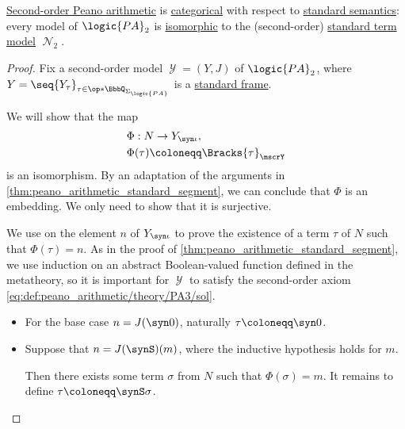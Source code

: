 \begin{proposition}\label{thm:peano_arithmetic_categoricity}
  \hyperref[def:peano_arithmetic]{Second-order Peano arithmetic} is \hyperref[def:hol_theory/categorical]{categorical} with respect to \hyperref[def:hol_semantics/standard]{standard semantics}: every model of \( \logic{PA}_2 \) is \hyperref[def:hol_isomorphism]{isomorphic} to the (second-order) \hyperref[def:peano_arithmetic_term_model]{standard term model} \( \mscrN_2 \).
\end{proposition}
\begin{proof}
  Fix a second-order model \( \mscrY = (Y, J) \) of \( \logic{PA}_2 \), where \( Y = \seq{ Y_\tau }_{\tau \in \op*{\BbbQ_{\Sigma_{\logic{PA}}}}} \) is a \hyperref[def:hol_frame]{standard frame}.

  We will show that the map
  \begin{equation*}
    \begin{aligned}
      &\Phi: N \to Y_{\syn\iota}, \\
      &\Phi(\tau) \coloneqq \Bracks{\tau}_\mscrY
    \end{aligned}
  \end{equation*}
  is an isomorphism. By an adaptation of the arguments in \cref{thm:peano_arithmetic_standard_segment}, we can conclude that \( \Phi \) is an embedding. We only need to show that it is surjective.

  We use  on the element \( n \) of \( Y_{\syn\iota} \) to prove the existence of a term \( \tau \) of \( N \) such that \( \Phi(\tau) = n \). As in the proof of \cref{thm:peano_arithmetic_standard_segment}, we use induction on an abstract Boolean-valued function defined in the metatheory, so it is important for \( \mscrY \) to satisfy the second-order axiom \eqref{eq:def:peano_arithmetic/theory/PA3/sol}.

  \begin{itemize}
    \item For the base case \( n = J(\syn0) \), naturally \( \tau \coloneqq \syn0 \).
    \item Suppose that \( n = J(\synS)(m) \), where the inductive hypothesis holds for \( m \).

    Then there exists some term \( \sigma \) from \( N \) such that \( \Phi(\sigma) = m \). It remains to define \( \tau \coloneqq \synS \sigma \).
  \end{itemize}
\end{proof}


